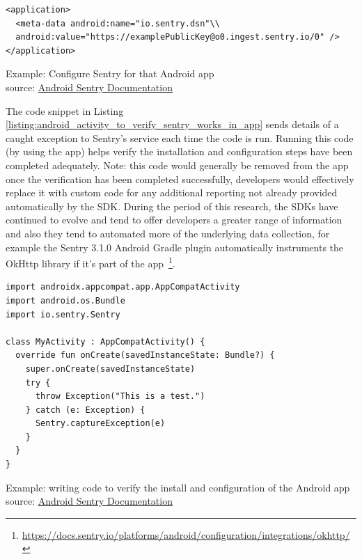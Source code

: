 \begin{listing}
\begin{verbatim}
<application>
  <meta-data android:name="io.sentry.dsn"\\
  android:value="https://examplePublicKey@o0.ingest.sentry.io/0" />
</application>
\end{verbatim}
\caption{Example: Configure Sentry for that Android app\\source: \href{https://docs.sentry.io/platforms/android/}{Android Sentry Documentation}}
\label{listing:android_manifest_xml_for_sentry}
\end{listing}

The code snippet in Listing \ref{listing:android_activity_to_verify_sentry_works_in_app} sends details of a caught exception to Sentry's service each time the code is run. Running this code (by using the app) helps verify the installation and configuration steps have been completed adequately. Note: this code would generally be removed from the app once the verification has been completed successfully, developers would effectively replace it with custom code for any additional reporting not already provided automatically by the SDK. %
During the period of this research, the SDKs have continued to evolve and tend to offer developers a greater range of information and also they tend to automated more of the underlying data collection, for example the Sentry 3.1.0 Android Gradle plugin automatically instruments the OkHttp library if it's part of the app~\footnote{\url{https://docs.sentry.io/platforms/android/configuration/integrations/okhttp/}}.


\begin{listing}
\begin{verbatim}
import androidx.appcompat.app.AppCompatActivity
import android.os.Bundle
import io.sentry.Sentry

class MyActivity : AppCompatActivity() {
  override fun onCreate(savedInstanceState: Bundle?) {
    super.onCreate(savedInstanceState)
    try {
      throw Exception("This is a test.")
    } catch (e: Exception) {
      Sentry.captureException(e)
    }
  }
}
\end{verbatim}
\caption{Example: writing code to verify the install and configuration of the Android app\\ source: \href{https://docs.sentry.io/platforms/android/}{Android Sentry Documentation}}
\label{listing:android_activity_to_verify_sentry_works_in_app}
\end{listing}

